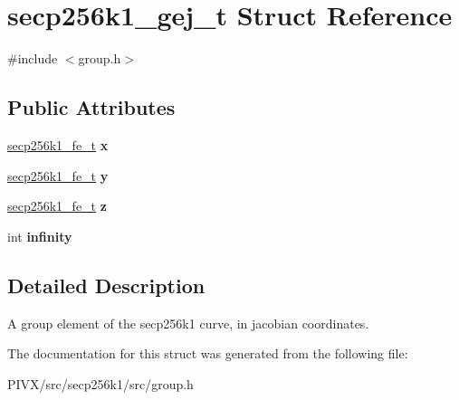 \hypertarget{structsecp256k1__gej__t}{}\section{secp256k1\+\_\+gej\+\_\+t Struct Reference}
\label{structsecp256k1__gej__t}


{\ttfamily \#include $<$group.\+h$>$}

\subsection*{Public Attributes}
\begin{DoxyCompactItemize}
\item 
\mbox{\label{structsecp256k1__gej__t_a082772e446c61435cb7bb44d653832e5}} 
\mbox{\hyperlink{structsecp256k1__fe__t}{secp256k1\+\_\+fe\+\_\+t}} {\bfseries x}
\item 
\mbox{\label{structsecp256k1__gej__t_aa7f636e3d46a6e7021db2300796a1a0e}} 
\mbox{\hyperlink{structsecp256k1__fe__t}{secp256k1\+\_\+fe\+\_\+t}} {\bfseries y}
\item 
\mbox{\label{structsecp256k1__gej__t_a93369d9af4afba2d61e93e02868ea556}} 
\mbox{\hyperlink{structsecp256k1__fe__t}{secp256k1\+\_\+fe\+\_\+t}} {\bfseries z}
\item 
\mbox{\label{structsecp256k1__gej__t_a53a9190e43576d9183d5c4b653f6bbbf}} 
int {\bfseries infinity}
\end{DoxyCompactItemize}


\subsection{Detailed Description}
A group element of the secp256k1 curve, in jacobian coordinates. 

The documentation for this struct was generated from the following file\+:\begin{DoxyCompactItemize}
\item 
P\+I\+V\+X/src/secp256k1/src/group.\+h\end{DoxyCompactItemize}
